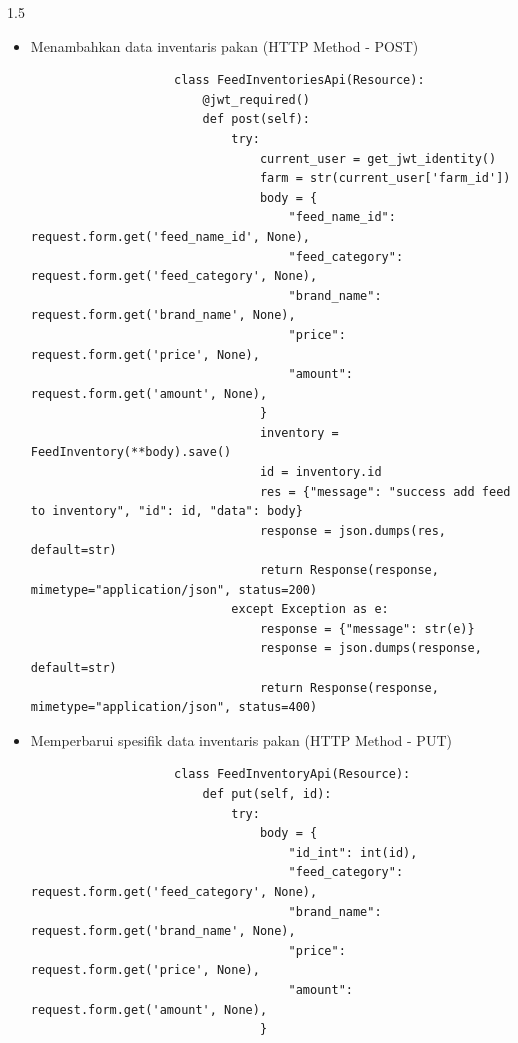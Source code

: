 \begin{spacing}{1.5}
\begin{enumerate}
\begin{enumerate}
\begin{itemize}
\begin{lstlisting}
								testing = FeedInventory.objects.aggregate(pipeline)
								temp = list(testing)
								if len(temp) == 0:
									res = {"message": 'no data found'}
									response = json.dumps(res, default=str)
									return Response(response, mimetype="application/json", status=200)
								response = json.dumps({
									'status': 'success',
									'data': temp[0],
								}, default=str)
								return Response(response, mimetype="application/json", status=200)
							except Exception as e:
								response = {"message": e}
								response = json.dumps(response, default=str)
								return Response(response, mimetype="application/json", status=400)
				\end{lstlisting}

				\item Menambahkan data inventaris pakan (HTTP Method - POST)
				
				\begin{lstlisting}
					class FeedInventoriesApi(Resource):
						@jwt_required()
						def post(self):
							try:
								current_user = get_jwt_identity()
								farm = str(current_user['farm_id'])
								body = {
									"feed_name_id": request.form.get('feed_name_id', None),
									"feed_category": request.form.get('feed_category', None),
									"brand_name": request.form.get('brand_name', None),
									"price": request.form.get('price', None),
									"amount": request.form.get('amount', None),
								}
								inventory = FeedInventory(**body).save()
								id = inventory.id
								res = {"message": "success add feed to inventory", "id": id, "data": body}
								response = json.dumps(res, default=str)
								return Response(response, mimetype="application/json", status=200)
							except Exception as e:
								response = {"message": str(e)}
								response = json.dumps(response, default=str)
								return Response(response, mimetype="application/json", status=400)
				\end{lstlisting}

				\item Memperbarui spesifik data inventaris pakan (HTTP Method - PUT)
				
				\begin{lstlisting}
					class FeedInventoryApi(Resource):
						def put(self, id):
							try:
								body = {
									"id_int": int(id),		
									"feed_category": request.form.get('feed_category', None),
									"brand_name": request.form.get('brand_name', None),
									"price": request.form.get('price', None),
									"amount": request.form.get('amount', None),
								}


\end{lstlisting}
\end{itemize}
\end{enumerate}
\end{enumerate}
\end{spacing}
